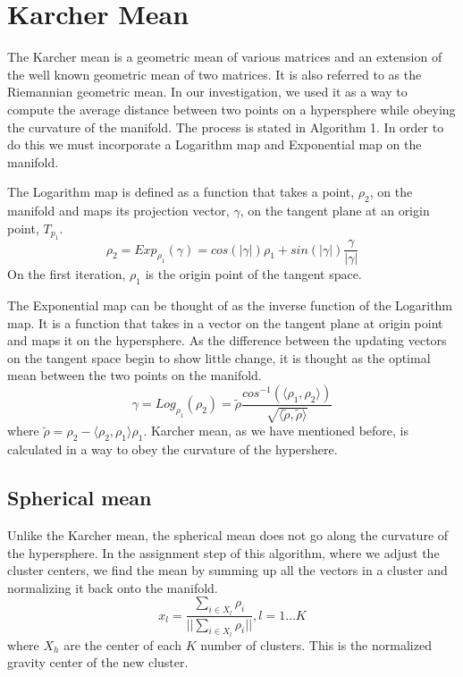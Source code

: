 \documentclass[../tech_report_1.tex]{subfiles}
\begin{document}
\section{Karcher Mean}

The Karcher mean is a geometric mean of various matrices and an extension
of the well known geometric mean of two matrices. It is also referred
to as the Riemannian geometric mean. In our investigation, we used
it as a way to compute the average distance between two points on
a hypersphere while obeying the curvature of the manifold. The process
is stated in Algorithm 1. In order to do this we must incorporate a
Logarithm map and Exponential map on the manifold. 




The Logarithm map is defined as a function that takes a point, $\rho_{2}$,
on the manifold and maps its projection vector, $\gamma$, on the
tangent plane at an origin point, $T_{p_{1}}$. 
\begin{equation}
\rho_{2}=Exp_{\rho_{1}}(\gamma)=cos(|\gamma|)\rho_{1}+sin(|\gamma|)\frac{\gamma}{|\gamma|}\label{eq:1}
\end{equation}
On the first iteration, $\rho_{1}$ is the origin point of the tangent
space.

The Exponential map can be thought of as the inverse function of the
Logarithm map. It is a function that takes in a vector on the tangent
plane at origin point and maps it on the hypersphere. As the difference
between the updating vectors on the tangent space begin to show little
change, it is thought as the optimal mean between the two points on
the manifold.
\begin{equation}
\gamma=Log_{\rho_{1}}(\rho_{2})=\tilde{\rho}\frac{cos^{-1}(\langle\rho_{1},\rho_{2}\rangle)}{\sqrt{\langle\tilde{\rho},\tilde{\rho}\rangle}}\label{eq:2}
\end{equation}
where $\tilde{\rho}=\rho_{2}-\langle\rho_{2},\rho_{1}\rangle\rho_{1}$.
Karcher mean, as we have mentioned before, is calculated in a way
to obey the curvature of the hypershere.


\subsection{Spherical mean}

Unlike the Karcher mean, the spherical mean does not go along the
curvature of the hypersphere. In the assignment step of this algorithm,
where we adjust the cluster centers, we find the mean by summing up
all the vectors in a cluster and normalizing it back onto the manifold.
\[
x_{l}=\frac{\sum_{i\in X_{l}}\rho_{i}}{||\sum_{i\in X_{l}}\rho_{i}||},l=1\dots K
\]
 where $X_{h}$ are the center of each $K$ number of clusters. This
is the normalized gravity center of the new cluster. 
\end{document}
